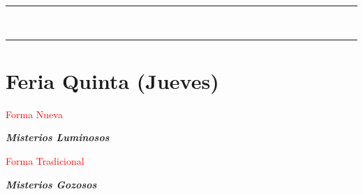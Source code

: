 \documentclass[10pt,twoside]{book}
\begin{document}
\begin{center}
      \begin{spacing}{0.25}
            {\rule{20em}{0.4pt}}\\
            {\rule{20em}{0.4pt}}
      \end{spacing}
\end{center}


\section*{\centering Feria Quinta (Jueves)}

\begin{paracol}{2}
      \begin{leftcolumn*}
            \begin{center}
                  \textcolor{red}{Forma Nueva}

                  \textbf{\textsl{Misterios Luminosos}}
            \end{center}

            
      \end{leftcolumn*}
      \begin{rightcolumn}
            \begin{center}
                  \textcolor{red}{Forma Tradicional}

                  \textbf{\textsl{Misterios Gozosos}}
            \end{center}

            
      \end{rightcolumn}
\end{paracol}


\end{document}
